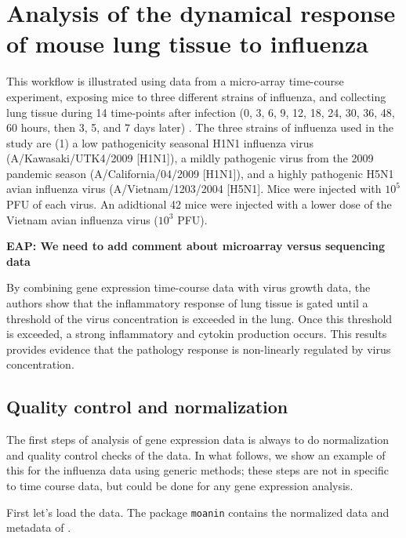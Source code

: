 \documentclass[9pt,a4paper,]{extarticle}
\begin{document}
\hypertarget{analysis-of-the-dynamical-response-of-mouse-lung-tissue-to-influenza}{%
\section{Analysis of the dynamical response of mouse lung tissue to influenza}\label{analysis-of-the-dynamical-response-of-mouse-lung-tissue-to-influenza}}

This workflow is illustrated using data from a micro-array time-course
experiment, exposing mice to three different strains of influenza, and
collecting lung tissue during 14 time-points after infection (0, 3, 6, 9, 12,
18, 24, 30, 36, 48, 60 hours, then 3, 5, and 7 days later)
\citep{shoemaker:ultrasensitive}. The three strains of influenza used in the
study are (1) a low pathogenicity seasonal H1N1 influenza virus
(A/Kawasaki/UTK4/2009 {[}H1N1{]}), a mildly pathogenic virus from the 2009
pandemic season (A/California/04/2009 {[}H1N1{]}), and a highly pathogenic H5N1
avian influenza virus (A/Vietnam/1203/2004 {[}H5N1{]}. Mice were injected with
\(10^5\) PFU of each virus. An adidtional 42 mice were injected with a lower dose
of the Vietnam avian influenza virus (\(10^3\) PFU).

\textbf{EAP: We need to add comment about microarray versus sequencing data}

By combining gene expression time-course data with virus growth data, the
authors show that the inflammatory response of lung tissue is gated until a
threshold of the virus concentration is exceeded in the lung. Once this
threshold is exceeded, a strong inflammatory and cytokin production occurs.
This results provides evidence that the pathology response is non-linearly
regulated by virus concentration.

\hypertarget{quality-control-and-normalization}{%
\subsection{Quality control and normalization}\label{quality-control-and-normalization}}

The first steps of analysis of gene expression data is always to do
normalization and quality control checks of the data. In what follows, we show
an example of this for the influenza data using generic methods; these steps
are not in specific to time course data, but could be done for any gene expression
analysis.

First let's load the data. The package \texttt{moanin} contains the normalized
data and metadata of \citep{shoemaker:ultrasensitive}.
\end{document}

